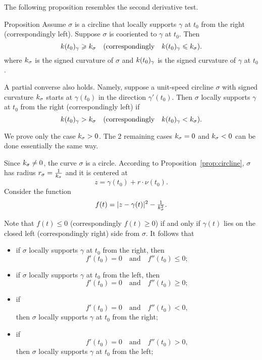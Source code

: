 The following proposition resembles the second derivative test. 

\begin{thm}{Proposition}\label{prop:supporting-circline}
Assume $\sigma$ is a circline that locally supports $\gamma$ at $t_0$ from the right (correspondingly left). 
Suppose $\sigma$ is cooriented to $\gamma$ at $t_0$.
Then 
\[k(t_0)_\gamma\geqslant k_\sigma
\quad(\text{correspondingly}\quad k(t_0)_\gamma\leqslant k_\sigma).
\] 
where $k_\sigma$ is the signed curvature of $\sigma$ 
and $k(t_0)_\gamma$ is the signed curvature of $\gamma$ at $t_0$.

A partial converse also holds.
Namely, suppose a unit-speed circline $\sigma$ with signed curvature $k_\sigma$ starts at $\gamma(t_0)$ in the direction $\gamma'(t_0)$.
Then $\sigma$ locally supports $\gamma$ at $t_0$ from the right (correspondingly left) if 
\[k(t_0)_\gamma> k_\sigma
\quad(\text{correspondingly}\quad k(t_0)_\gamma< k_\sigma).
\]

\end{thm}


We prove only the case $k_\sigma>0$.
The 2 remaining cases $k_\sigma=0$ and $k_\sigma<0$ can be done essentially the same way.

Since $k_\sigma\ne0$, the curve $\sigma$ is a circle.
According to Proposition~\ref{prop:circline},
$\sigma$ has radius $r_\sigma=\tfrac1{k_\sigma}$ and it is centered at 
\[z=\gamma(t_0)+r\cdot\nu(t_0).\]
Consider the function 
\[f(t)=|z-\gamma(t)|^2-\tfrac1{k_\sigma^2}.\]

Note that $f(t)\le0$ (correspondingly $f(t)\ge0$) 
if and only if $\gamma(t)$ lies on the closed left (correspondingly right) side from $\sigma$.
It follows that 
\begin{itemize}
\item if $\sigma$ locally supports $\gamma$ at $t_0$ from the right, 
then
\[f'(t_0)=0\quad\text{and}\quad f''(t_0)\le 0;\]

\item if $\sigma$ locally supports $\gamma$ at $t_0$ from  the left, 
then 
\[f'(t_0)=0\quad\text{and}\quad f''(t_0)\ge 0;\]

\item if 
\[f'(t_0)=0\quad\text{and}\quad f''(t_0)< 0,\]
then $\sigma$ locally supports $\gamma$ at $t_0$ from  the right;

\item if 
\[f'(t_0)=0\quad\text{and}\quad f''(t_0)> 0,\] then $\sigma$ locally supports $\gamma$ at $t_0$ from  the left;
\end{itemize}

